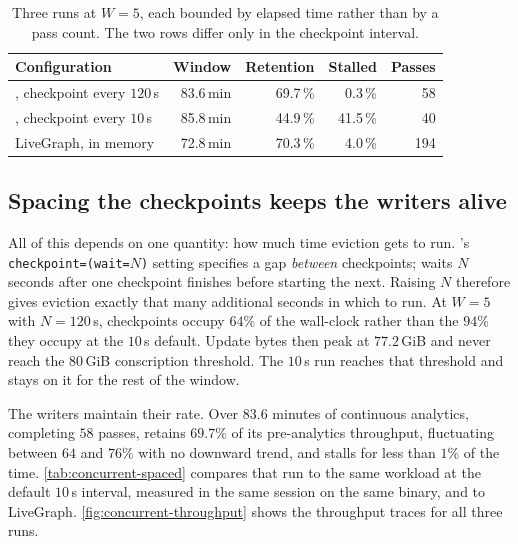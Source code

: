 \begin{table}[t]
  \centering
  \setlength{\tabcolsep}{5pt}\renewcommand{\arraystretch}{1.05}
  \small
  \begin{tabular}{l r r r r}
  \toprule
  Configuration & Window & Retention & Stalled & Passes \\
  \midrule
  \project{}, checkpoint every $120$\,s & 83.6\,min & 69.7\,\% & 0.3\,\% & 58 \\
  \project{}, checkpoint every $10$\,s  & 85.8\,min & 44.9\,\% & 41.5\,\% & 40 \\
  LiveGraph, in memory                  & 72.8\,min & 70.3\,\% & 4.0\,\% & 194 \\
  \bottomrule
  \end{tabular}
  \caption{Three runs at $W=5$, each bounded by elapsed time rather than by a pass count.
  The two \project{} rows differ only in the checkpoint interval.}
  \label{tab:concurrent-spaced}
\end{table}

\subsection{Spacing the checkpoints keeps the writers alive}
\label{sec:eval:dynamic:concurrent:spaced}

All of this depends on one quantity: how much time eviction gets to run.
\wt{}'s \texttt{checkpoint=(wait=$N$)} setting specifies a gap \emph{between} checkpoints; \wt{} waits $N$ seconds after one checkpoint finishes before starting the next.
Raising $N$ therefore gives eviction exactly that many additional seconds in which to run.
At $W=5$ with $N=120$\,s, checkpoints occupy $64\%$ of the wall-clock rather than the $94\%$ they occupy at the $10$\,s default.
Update bytes then peak at $77.2$\,GiB and never reach the $80$\,GiB conscription threshold.
The $10$\,s run reaches that threshold and stays on it for the rest of the window.

The writers maintain their rate.
Over $83.6$ minutes of continuous analytics, completing $58$ passes, \project{} retains $69.7\%$ of its pre-analytics throughput, fluctuating between $64$ and $76\%$ with no downward trend, and stalls for less than $1\%$ of the time.
\autoref{tab:concurrent-spaced} compares that run to the same workload at the default $10$\,s interval, measured in the same session on the same binary, and to LiveGraph.
\autoref{fig:concurrent-throughput} shows the throughput traces for all three runs.

